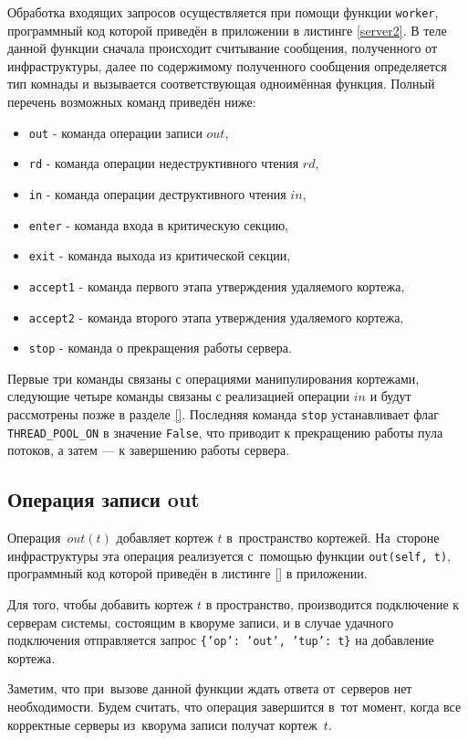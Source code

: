 Обработка входящих запросов осуществляется при помощи функции \texttt{worker}, программный код которой приведён в приложении в листинге \ref{server2}. В теле данной функции сначала происходит считывание сообщения, полученного от инфраструктуры, далее по содержимому полученного сообщения определяется тип комнады и вызывается соответствующая одноимённая функция. Полный перечень возможных команд приведён ниже:
\begin{itemize}
	\item \texttt{out} - команда операции записи $out$,
	\item \texttt{rd} - команда операции недеструктивного чтения $rd$,
	\item \texttt{in} - команда операции деструктивного чтения $in$,
	\item \texttt{enter} - команда входа в критическую секцию,
	\item \texttt{exit} - команда выхода из критической секции,
	\item \texttt{accept1} - команда первого этапа утверждения удаляемого кортежа,
	\item \texttt{accept2} - команда второго этапа утверждения удаляемого кортежа,
	\item \texttt{stop} - команда о прекращения работы сервера.
\end{itemize}
Первые три команды связаны с операциями манипулирования кортежами, следующие четыре команды связаны с реализацией операции $in$ и будут рассмотрены позже в разделе \ref{}. Последняя команда \texttt{stop} устанавливает флаг \texttt{THREAD_POOL_ON} в значение \texttt{False}, что приводит к прекращению работы пула потоков, а затем --- к завершению работы сервера.


\subsection{Операция записи out}\label{subsec:6}
Операция~$out(t)$ добавляет кортеж $t$ в~пространство кортежей. На~стороне инфраструктуры эта операция реализуется с~помощью функции \texttt{out(self, t)}, программный код которой приведён в листинге \ref{} в приложении.

Для того, чтобы добавить кортеж $t$ в пространство, производится подключение к серверам системы, состоящим в кворуме записи, и в случае удачного подключения отправляется запрос \texttt{\{'op': 'out', 'tup': t\}} на добавление кортежа.

Заметим, что при~вызове данной функции ждать ответа от~серверов нет необходимости. Будем считать, что операция завершится в~тот момент, когда все корректные серверы из~кворума записи получат кортеж~$t$.

